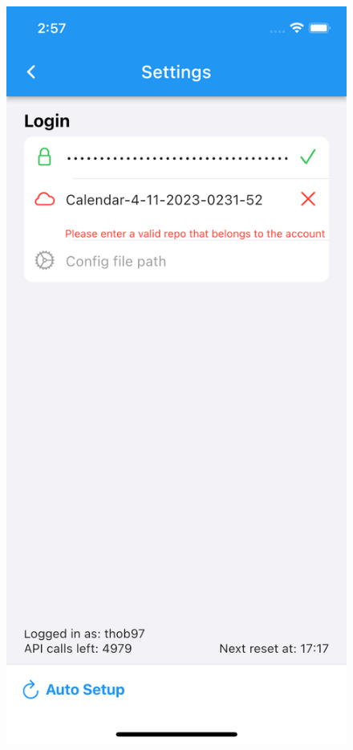 \begin{figure}
\centering
\begin{minipage}{.5\textwidth}
  \centering
  \includegraphics[width=0.9\linewidth]{res/settings_page.png}
  \label{fig:settings_page}
\end{minipage}%

\end{figure}
